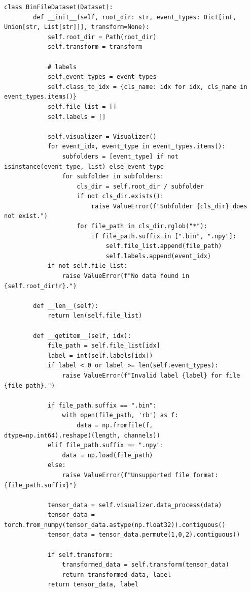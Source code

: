 \begin{lstlisting}[style=pythonstyle, caption={Custom Dataset for loading and processing footstep files}, label=lst:binfile_dataset]
    class BinFileDataset(Dataset):
        def __init__(self, root_dir: str, event_types: Dict[int, Union[str, List[str]]], transform=None):
            self.root_dir = Path(root_dir)
            self.transform = transform
    
            # labels
            self.event_types = event_types
            self.class_to_idx = {cls_name: idx for idx, cls_name in event_types.items()}
            self.file_list = []
            self.labels = []
    
            self.visualizer = Visualizer()
            for event_idx, event_type in event_types.items():
                subfolders = [event_type] if not isinstance(event_type, list) else event_type
                for subfolder in subfolders:
                    cls_dir = self.root_dir / subfolder
                    if not cls_dir.exists():
                        raise ValueError(f"Subfolder {cls_dir} does not exist.")
                    for file_path in cls_dir.rglob("*"):
                        if file_path.suffix in [".bin", ".npy"]:
                            self.file_list.append(file_path)
                            self.labels.append(event_idx)
            if not self.file_list:
                raise ValueError(f"No data found in {self.root_dir!r}.")
    
        def __len__(self):
            return len(self.file_list)
    
        def __getitem__(self, idx):
            file_path = self.file_list[idx]
            label = int(self.labels[idx])
            if label < 0 or label >= len(self.event_types):
                raise ValueError(f"Invalid label {label} for file {file_path}.")
    
            if file_path.suffix == ".bin":
                with open(file_path, 'rb') as f:
                    data = np.fromfile(f, dtype=np.int64).reshape((length, channels))
            elif file_path.suffix == ".npy":
                data = np.load(file_path)
            else:
                raise ValueError(f"Unsupported file format: {file_path.suffix}")
    
            tensor_data = self.visualizer.data_process(data)
            tensor_data = torch.from_numpy(tensor_data.astype(np.float32)).contiguous()
            tensor_data = tensor_data.permute(1,0,2).contiguous()
    
            if self.transform:
                transformed_data = self.transform(tensor_data)
                return transformed_data, label
            return tensor_data, label
\end{lstlisting}

